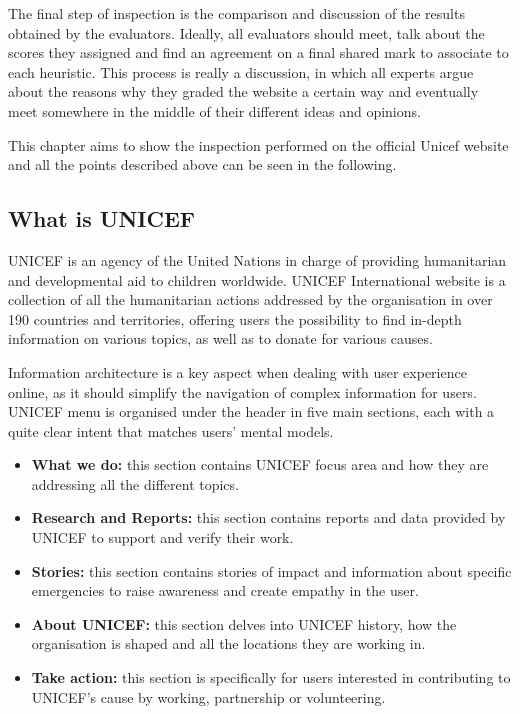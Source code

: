 The final step of inspection is the comparison and discussion of the results obtained by the evaluators. Ideally, all evaluators should meet, talk about the scores they assigned and find an agreement on a final shared mark to associate to each heuristic. This process is really a discussion, in which all experts argue about the reasons why they graded the website a certain way and eventually meet somewhere in the middle of their different ideas and opinions.

This chapter aims to show the inspection performed on the official Unicef website and all the points described above can be seen in the following.
\clearpage

\subsection{What is UNICEF}
UNICEF is an agency of the United Nations in charge of providing humanitarian and developmental aid to children worldwide. UNICEF International website is a collection of all the humanitarian actions addressed by the organisation in over 190 countries and territories, offering users the possibility to find in-depth information on various topics, as well as to donate for various causes.

Information architecture is a key aspect when dealing with user experience online, as it should simplify the navigation of complex information for users. UNICEF menu is organised under the header in five main sections, each with a quite clear intent that matches users’ mental models.

\begin{itemize}
    \item \textbf{What we do:} this section contains UNICEF focus area and how they are addressing all the different topics.
    \item \textbf{Research and Reports:} this section contains reports and data provided by UNICEF to support and verify their work.
    \item \textbf{Stories:} this section contains stories of impact and information about specific emergencies to raise awareness and create empathy in the user.
    \item \textbf{About UNICEF:} this section delves into UNICEF history, how the organisation is shaped and all the locations they are working in.
    \item \textbf{Take action:} this section is specifically for users interested in contributing to UNICEF's cause by working, partnership or volunteering.
\end{itemize}

